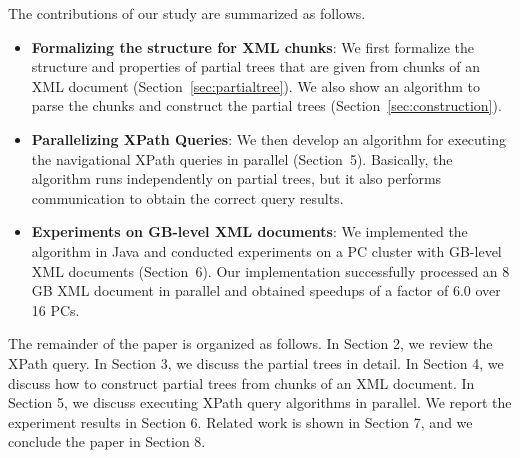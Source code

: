 The contributions of our study are summarized as follows.

\begin{itemize}
\item \textbf{Formalizing the structure for XML chunks}:
We first formalize the structure and properties of partial trees that are given from chunks of an XML document (Section~\ref{sec:partialtree}). We also show an algorithm to parse the chunks and construct the partial trees (Section~\ref{sec:construction}).

\item \textbf{Parallelizing XPath Queries}:
We then develop an algorithm for executing the navigational XPath queries in parallel (Section~5).
Basically, the algorithm runs independently on partial trees, but it also performs communication
to obtain the correct query results.

\item \textbf{Experiments on GB-level XML documents}:
We implemented the algorithm in Java and conducted experiments on a PC cluster with GB-level XML documents (Section~6).  Our implementation successfully processed an 8 GB XML document in parallel and obtained speedups of a factor of 6.0 over 16 PCs.
\end{itemize}


The remainder of the paper is organized as follows. In Section 2, we review the XPath query. In Section 3, we discuss the partial trees in detail. In Section 4, we discuss how to construct partial trees from chunks of an XML document. In Section 5, we discuss executing XPath query  algorithms in parallel. We 
report the experiment results in Section 6. Related work is shown in Section 7, and we conclude the paper in Section 8.


